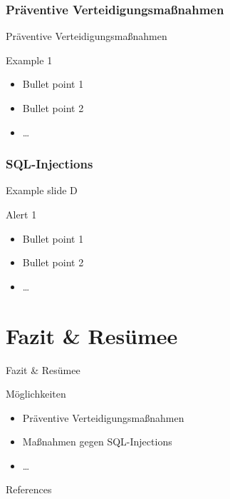 \documentclass[18pt]{beamer}
\begin{document}
\subsubsection{Präventive Verteidigungsmaßnahmen}
\begin{frame}{Präventive Verteidigungsmaßnahmen}
\begin{exampleblock}{Example 1}
\begin{itemize}
\item Bullet point 1
\pause
\item Bullet point 2
\item \dots
\end{itemize}
\end{exampleblock}
\end{frame}

\subsubsection{SQL-Injections}
\begin{frame}{Example slide D}
\begin{alertblock}{Alert 1}
\begin{itemize}
\item Bullet point 1
\pause
\item Bullet point 2
\item \dots
\end{itemize}
\end{alertblock}
\end{frame}




\section{Fazit & Resümee}
\begin{frame}{Fazit & Resümee}
\begin{exampleblock}{Möglichkeiten}
\begin{itemize}
\item Präventive Verteidigungsmaßnahmen
\pause
\item Maßnahmen gegen SQL-Injections
\item \dots
\end{itemize}
\end{exampleblock}
\end{frame}



\appendix
\beginbackup

\begin{frame}[allowframebreaks]{References}
\printbibliography
\end{frame}

\backupend
\end{document}

